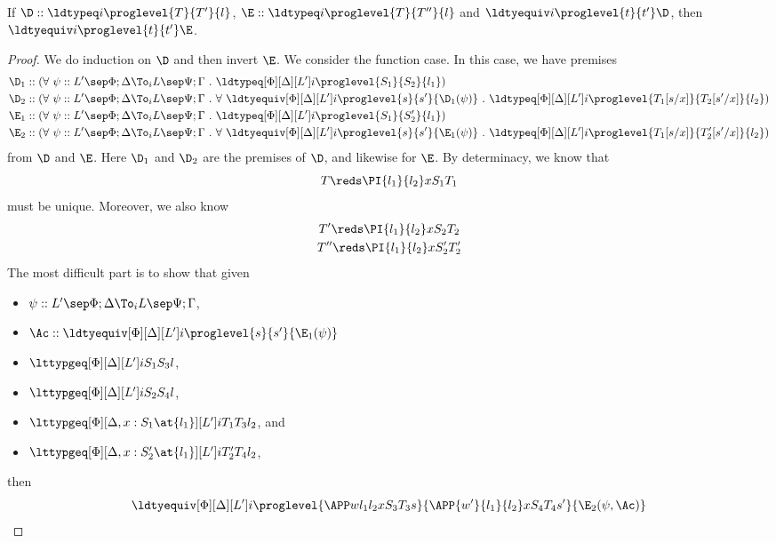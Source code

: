 \begin{lemma}
  If $\D :: \ldtypeq i \proglevel{T}{T'}{l}$, $\E :: \ldtypeq i \proglevel{T}{T''}{l}$ and
  $\ldtyequiv i \proglevel{t}{t'}\D$, then $\ldtyequiv i \proglevel{t}{t'}\E$.
\end{lemma}
\begin{proof}
  We do induction on $\D$ and then invert $\E$. %
  We consider the function case. %
  In this case, we have premises
  \begin{align*}
    \D_1 &:: (\forall~ \psi :: L' \sep \Phi;\Delta \To_i L \sep \Psi; \Gamma ~.~
    \ldtypeq[\Phi][\Delta][L'] i \proglevel{S_1}{S_2}{l_1}) \\
    \D_2 &:: (\forall~ \psi :: L' \sep \Phi;\Delta \To_i L \sep \Psi; \Gamma ~.~ \forall~ \ldtyequiv[\Phi][\Delta][L']
    i \proglevel {s}{s'}{\D_1(\psi)} ~.~
    \ldtypeq[\Phi][\Delta][L'] i \proglevel{T_1[s/x]}{T_2[s'/x]}{l_2}) \\
    \E_1 &:: (\forall~ \psi :: L' \sep \Phi;\Delta \To_i L \sep \Psi; \Gamma ~.~
    \ldtypeq[\Phi][\Delta][L'] i \proglevel{S_1}{S_2'}{l_1}) \\
    \E_2 &:: (\forall~ \psi :: L' \sep \Phi;\Delta \To_i L \sep \Psi; \Gamma ~.~ \forall~ \ldtyequiv[\Phi][\Delta][L']
    i \proglevel {s}{s'}{\E_1(\psi)} ~.~
    \ldtypeq[\Phi][\Delta][L'] i \proglevel{T_1[s/x]}{T_2'[s'/x]}{l_2})
  \end{align*}
  from $\D$ and $\E$. %
  Here $\D_1$ and $\D_2$ are the premises of $\D$, and likewise for $\E$. %
  By determinacy, we know that
  \[
    T \reds \PI{l_1}{l_2} x{S_1}{T_1}
  \]
  must be unique.  %
  Moreover, we also know
  \begin{gather*}
    T' \reds \PI{l_1}{l_2} x{S_2}{T_2} \\
    T'' \reds \PI{l_1}{l_2} x{S_2'}{T_2'}
  \end{gather*}
  The most difficult part is to show that given
  \begin{itemize}
  \item $\psi :: L' \sep \Phi;\Delta \To_i L \sep \Psi; \Gamma$,    
  \item $\Ac :: \ldtyequiv[\Phi][\Delta][L'] i \proglevel {s}{s'}{\E_1(\psi)}$
  \item $\lttypgeq[\Phi][\Delta][L'] i{S_1}{S_3}l$,
  \item $\lttypgeq[\Phi][\Delta][L'] i{S_2}{S_4}l$, 
  \item $\lttypgeq[\Phi][\Delta, x : S_1 \at{l_1}][L'] i{T_1}{T_3}{l_2}$, and
  \item $\lttypgeq[\Phi][\Delta, x : S_2' \at{l_1}][L'] i{T_2'}{T_4}{l_2}$,
  \end{itemize}
  then
  \[
    \ldtyequiv[\Phi][\Delta][L'] i \proglevel{\APP w{l_1}{l_2} x{S_3}{T_3} s}{\APP{w'}{l_1}{l_2}
      x{S_4}{T_4}{s'}}{\E_2(\psi, \Ac)}
  \]


\end{proof}
